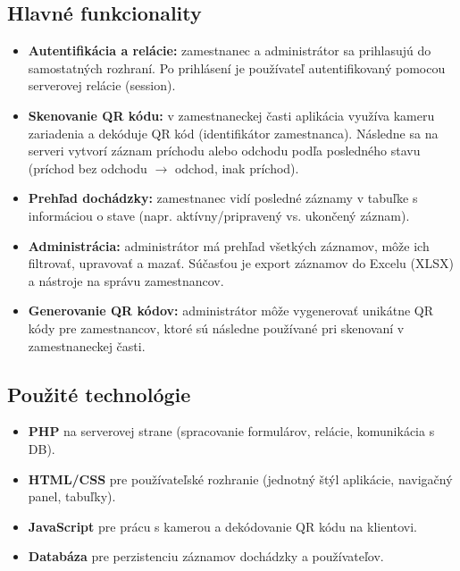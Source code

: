 \subsection{Hlavné funkcionality}

\begin{itemize}
  \item \textbf{Autentifikácia a relácie:} zamestnanec a administrátor sa prihlasujú do samostatných
  rozhraní. Po prihlásení je používateľ autentifikovaný pomocou serverovej relácie (session).
  \item \textbf{Skenovanie QR kódu:} v zamestnaneckej časti aplikácia využíva kameru zariadenia a
  dekóduje QR kód (identifikátor zamestnanca). Následne sa na serveri vytvorí záznam príchodu alebo
  odchodu podľa posledného stavu (príchod bez odchodu \(\rightarrow\) odchod, inak príchod).
  \item \textbf{Prehľad dochádzky:} zamestnanec vidí posledné záznamy v tabuľke s informáciou o stave
  (napr. aktívny/pripravený vs. ukončený záznam).
  \item \textbf{Administrácia:} administrátor má prehľad všetkých záznamov, môže ich filtrovať, upravovať
  a mazať. Súčasťou je export záznamov do Excelu (XLSX) a nástroje na správu zamestnancov.
  \item \textbf{Generovanie QR kódov:} administrátor môže vygenerovať unikátne QR kódy pre zamestnancov,
  ktoré sú následne používané pri skenovaní v zamestnaneckej časti.
\end{itemize}

\subsection{Použité technológie}

\begin{itemize}
  \item \textbf{PHP} na serverovej strane (spracovanie formulárov, relácie, komunikácia s DB).
  \item \textbf{HTML/CSS} pre používateľské rozhranie (jednotný štýl aplikácie, navigačný panel, tabuľky).
  \item \textbf{JavaScript} pre prácu s kamerou a dekódovanie QR kódu na klientovi.
  \item \textbf{Databáza} pre perzistenciu záznamov dochádzky a používateľov.
\end{itemize}
\normalsize
